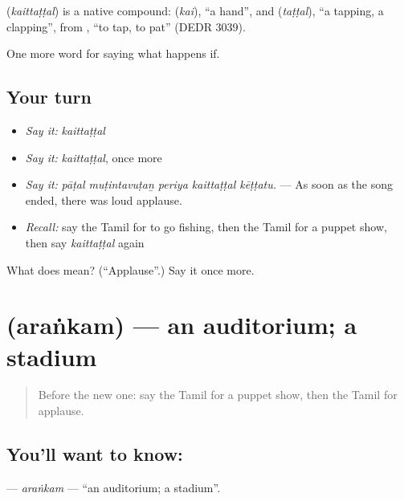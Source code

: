 \begin{cousinweb}
\textbf{} (\emph{kaittaṭṭal}) is a native compound:  (\emph{kai}), \textquotedblleft{}a hand\textquotedblright{}, and  (\emph{taṭṭal}), \textquotedblleft{}a tapping, a clapping\textquotedblright{}, from , \textquotedblleft{}to tap, to pat\textquotedblright{} (DEDR 3039).
\end{cousinweb}

\begin{grammarlens}[title={What you've built}]
One more word for saying what happens if.
\end{grammarlens}

\subsection*{Your turn}
\begin{itemize}
\raggedright
  \item \emph{Say it:} \emph{kaittaṭṭal}
  \item \emph{Say it:} \emph{kaittaṭṭal}, once more
  \item \emph{Say it:} \emph{pāṭal muṭintavuṭaṉ periya kaittaṭṭal kēṭṭatu.} — As soon as the song ended, there was loud applause.
  \item \emph{Recall:} say the Tamil for to go fishing, then the Tamil for a puppet show, then say \emph{kaittaṭṭal} again
\end{itemize}

\begin{tcolorbox}[breakable,colback=teal!4,colframe=teal!35!black,title={Before you move on}]
What does  mean? (\textquotedblleft{}Applause\textquotedblright{}.) Say it once more.
\end{tcolorbox}
\section[\texorpdfstring{\ta{அரங்கம்} (araṅkam)}{அரங்கம் (araṅkam)}]{ (araṅkam) — an auditorium; a stadium}

\label{lesson:TA-C555-arankam}



\begin{quote}
Before the new one: say the Tamil for a puppet show, then the Tamil for applause.
\end{quote}

\subsection*{You'll want to know: }
\textbf{} — \emph{araṅkam} — \textquotedblleft{}an auditorium; a stadium\textquotedblright{}.


